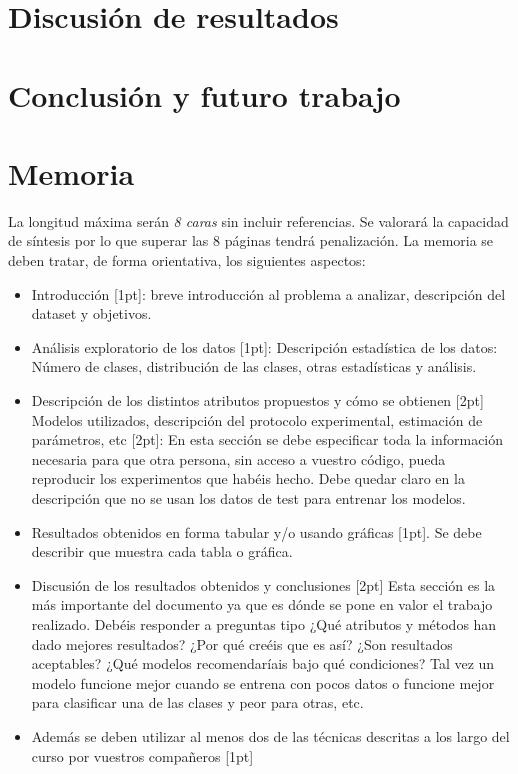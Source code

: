\documentclass{esannV2}
\begin{document}
\section{Discusión de resultados}



\section{Conclusión y futuro trabajo}


\section{Memoria}
La longitud máxima serán \emph{8 caras} sin incluir referencias. Se valorará la
capacidad de síntesis por lo que superar las 8 páginas tendrá penalización. La
memoria se deben tratar, de forma orientativa, los siguientes aspectos:

\begin{itemize}
\item Introducción [1pt]: breve introducción al problema a analizar, descripción del dataset y objetivos.
\item Análisis exploratorio de los datos [1pt]: Descripción estadística de los datos: Número de clases, distribución de las clases, otras estadísticas y análisis.
\item Descripción de los distintos atributos  propuestos y cómo se obtienen [2pt]
Modelos utilizados, descripción del protocolo experimental, estimación de parámetros, etc [2pt]: En esta sección se debe especificar toda la información necesaria para que otra persona, sin acceso a vuestro código, pueda reproducir los experimentos que habéis hecho. Debe quedar claro en la descripción que no se usan los datos de test para entrenar los modelos.
\item Resultados obtenidos en forma tabular y/o usando gráficas [1pt]. Se debe describir que muestra cada tabla o gráfica.
\item Discusión de los resultados obtenidos y conclusiones [2pt] Esta sección es la más importante del documento ya que es dónde se pone en valor el trabajo realizado. Debéis responder a preguntas  tipo ¿Qué atributos y métodos han dado mejores resultados? ¿Por qué creéis que es así? ¿Son resultados aceptables? ¿Qué modelos recomendaríais bajo qué condiciones? Tal vez un modelo funcione mejor cuando se entrena con pocos datos o funcione mejor para clasificar una de las clases y peor para otras, etc.
\item Además se deben utilizar al menos dos de las técnicas descritas a los largo del curso por vuestros compañeros [1pt]
\end{itemize}
\end{document}
